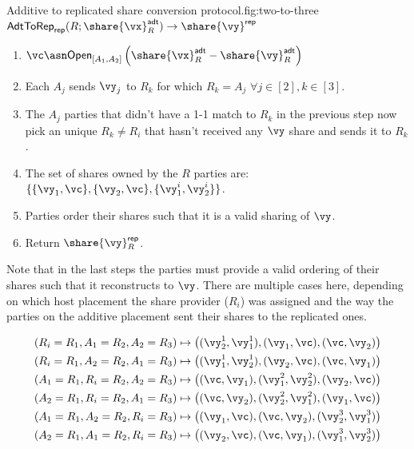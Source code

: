 \begin{Boxfig}{Additive to replicated share conversion
protocol.}{fig:two-to-three}{$\mathsf{AdtToRep}_\mathsf{rep}(R;
\share{\vx}^{\mathsf{adt}}_{R}) \rightarrow \share{\vy}^\mathsf{rep}$}
\begin{enumerate}
\item $\vc \asn \mathsf{Open}_{[A_1, A_2]}\left( \share{\vx}^{\mathsf{adt}}_{R}
- \share{\vy}^{\mathsf{adt}}_{R} \right)$
\item Each $A_j$ sends $\vy_j$ to $R_k$ for which $R_k = A_j$ $\forall j \in [2], k \in [3]$.
\item The $A_j$ parties that didn't have a 1-1 match to $R_k$ in the previous step now pick an unique $R_k \neq R_i$
that hasn't received any $\vy$ share and sends it to $R_k$.
\item The set of shares owned by the $R$ parties are: $\{ \{\vy_1, \vc\}, \{\vy_2, \vc\}, \{\vy^i_1, \vy^i_2\} \}$.
\item Parties order their shares such that it is a valid sharing of $\vy$.
\item Return $\share{\vy}^{\mathsf{rep}}_{R}$.
\end{enumerate}
\end{Boxfig}

Note that in the last steps the parties must provide a valid ordering of their
shares such that it reconstructs to $\vy$. There are multiple cases here,
depending on which host placement the share provider ($R_i$) was assigned and
the way the parties on the additive placement sent their shares to the replicated ones.

\begin{align*}
(R_i = R_1, A_1 = R_2, A_2 = R_3) \mapsto \left( (\vy_2^1, \vy_1^1), (\vy_1, \vc), (\vc, \vy_2) \right) \\
(R_i = R_1, A_2 = R_2, A_1 = R_3) \mapsto \left( (\vy_1^1, \vy_2^1), (\vy_2, \vc), (\vc, \vy_1) \right) \\
(A_1 = R_1, R_i = R_2, A_2 = R_3) \mapsto \left( (\vc, \vy_1), (\vy^2_1, \vy^2_2), (\vy_2, \vc) \right) \\
(A_2 = R_1, R_i = R_2, A_1 = R_3) \mapsto \left( (\vc, \vy_2), (\vy^2_2, \vy^2_1), (\vy_1, \vc) \right) \\
(A_1 = R_1, A_2 = R_2, R_i = R_3) \mapsto \left( (\vy_1, \vc), (\vc, \vy_2), (\vy_2^3, \vy_1^3) \right) \\
(A_2 = R_1, A_1 = R_2, R_i = R_3) \mapsto \left( (\vy_2, \vc), (\vc, \vy_1), (\vy_1^3, \vy_2^3) \right)
\end{align*}